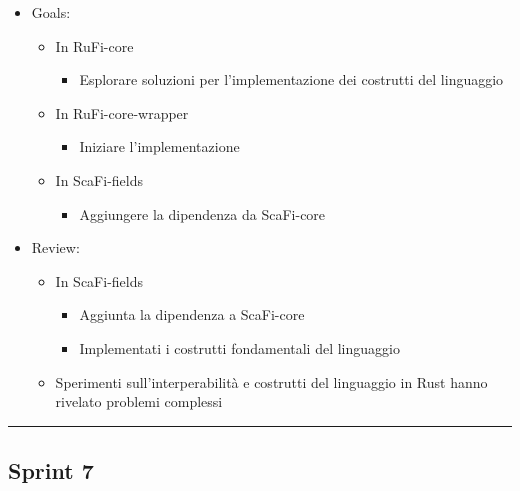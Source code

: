 \documentclass[12pt, a4paper]{article}
\begin{document}
\begin{itemize}
    \item Goals:
          \begin{itemize}
              \item In RuFi-core
                    \begin{itemize}
                        \item Esplorare soluzioni per l'implementazione dei costrutti del linguaggio
                    \end{itemize}
              \item In RuFi-core-wrapper
                    \begin{itemize}
                        \item Iniziare l'implementazione
                    \end{itemize}
              \item In ScaFi-fields
                    \begin{itemize}
                        \item Aggiungere la dipendenza da ScaFi-core
                    \end{itemize}
          \end{itemize}
    \item Review:
          \begin{itemize}
              \item In ScaFi-fields
                    \begin{itemize}
                        \item Aggiunta la dipendenza a ScaFi-core
                        \item Implementati i costrutti fondamentali del linguaggio
                    \end{itemize}
              \item Sperimenti sull'interperabilità e costrutti del linguaggio in Rust hanno rivelato problemi complessi
          \end{itemize}
\end{itemize}

\par\noindent\rule{\textwidth}{0.5pt}


\subsection*{Sprint 7}
\end{document}
